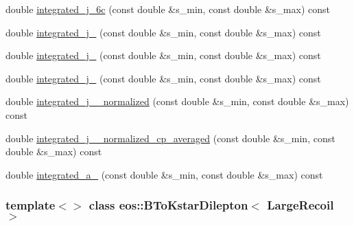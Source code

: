 \begin{DoxyCompactItemize}
double \hyperlink{classeos_1_1BToKstarDilepton_3_01LargeRecoil_01_4_affaef081192cd5f06c8aabd2a6ccc404}{integrated\_\-j\_\-6c} (const double \&s\_\-min, const double \&s\_\-max) const 
\item 
double \hyperlink{classeos_1_1BToKstarDilepton_3_01LargeRecoil_01_4_a1359d703e7bb13a8baea5500e955b8fd}{integrated\_\-j\_} (const double \&s\_\-min, const double \&s\_\-max) const 
\item 
double \hyperlink{classeos_1_1BToKstarDilepton_3_01LargeRecoil_01_4_af9105f4298f556dd4a9f449a820dcdd1}{integrated\_\-j\_} (const double \&s\_\-min, const double \&s\_\-max) const 
\item 
double \hyperlink{classeos_1_1BToKstarDilepton_3_01LargeRecoil_01_4_afd16f06bd47dcc25e9b63c55f54c8ea6}{integrated\_\-j\_} (const double \&s\_\-min, const double \&s\_\-max) const 
\item 
double \hyperlink{classeos_1_1BToKstarDilepton_3_01LargeRecoil_01_4_a22bdeb99bb04ac635496405758ecf0d1}{integrated\_\-j\_\_\-normalized} (const double \&s\_\-min, const double \&s\_\-max) const 
\item 
double \hyperlink{classeos_1_1BToKstarDilepton_3_01LargeRecoil_01_4_a32a3fbce3a956364c0b4d8248bee7047}{integrated\_\-j\_\_\-normalized\_\-cp\_\-averaged} (const double \&s\_\-min, const double \&s\_\-max) const 
\item 
double \hyperlink{classeos_1_1BToKstarDilepton_3_01LargeRecoil_01_4_a303b3535c292601d41a60b3a466c4092}{integrated\_\-a\_} (const double \&s\_\-min, const double \&s\_\-max) const 
\end{DoxyCompactItemize}
\subsubsection*{template$<$$>$ class eos::BToKstarDilepton$<$ LargeRecoil $>$}




